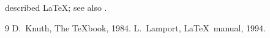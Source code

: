 \documentclass{article}
\begin{document}
\citet{lamport94} described \LaTeX; see also \citep{knuth84}.
\begin{thebibliography}{9}
 D.~Knuth, The \TeX book, 1984.
 L.~Lamport, \LaTeX\ manual, 1994.
\end{thebibliography}
\end{document}
